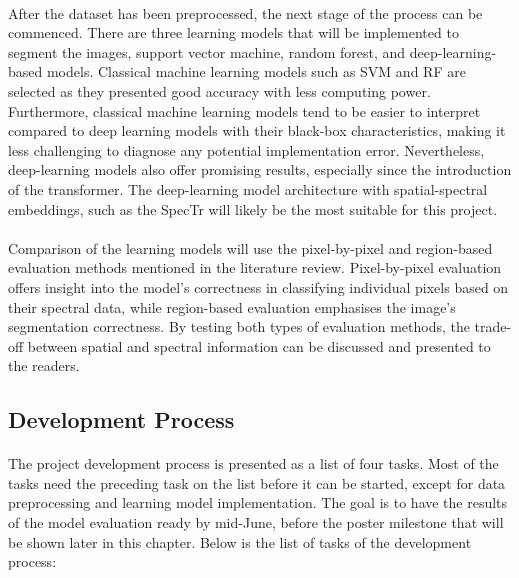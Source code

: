 \documentclass[12pt]{article}
\begin{document}
    \paragraph{}
    After the dataset has been preprocessed, the next stage of the process can be commenced. There are three learning models that will be implemented to segment the images, support vector machine, random forest, and deep-learning-based models. Classical machine learning models such as SVM and RF are selected as they presented good accuracy with less computing power. Furthermore, classical machine learning models tend to be easier to interpret compared to deep learning models with their black-box characteristics, making it less challenging to diagnose any potential implementation error. Nevertheless, deep-learning models also offer promising results, especially since the introduction of the transformer. The deep-learning model architecture with spatial-spectral embeddings, such as the SpecTr \cite{yun_spectr_2021} will likely be the most suitable for this project.
    
    \paragraph{}
    Comparison of the learning models will use the pixel-by-pixel and region-based evaluation methods mentioned in the literature review. Pixel-by-pixel evaluation offers insight into the model's correctness in classifying individual pixels based on their spectral data, while region-based evaluation emphasises the image's segmentation correctness. By testing both types of evaluation methods, the trade-off between spatial and spectral information can be discussed and presented to the readers.
    
    \subsection*{Development Process}
    \paragraph{}
    The project development process is presented as a list of four tasks. Most of the tasks need the preceding task on the list before it can be started, except for data preprocessing and learning model implementation. The goal is to have the results of the model evaluation ready by mid-June, before the poster milestone that will be shown later in this chapter. Below is the list of tasks of the development process:
    
\end{document}
